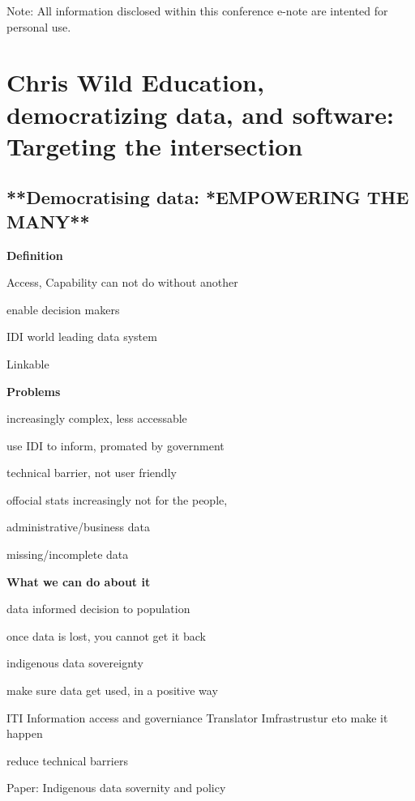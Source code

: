 \documentclass[
]{book}
\begin{document}
Note: All information disclosed within this conference e-note are intented for personal use.

\hypertarget{chris-wild-education-democratizing-data-and-software-targeting-the-intersection}{%
\chapter*{Chris Wild \textbar{} Education, democratizing data, and software: Targeting the intersection}\label{chris-wild-education-democratizing-data-and-software-targeting-the-intersection}}

\hypertarget{democratising-data-empowering-the-many}{%
\section{**Democratising data: *EMPOWERING THE MANY**}\label{democratising-data-empowering-the-many}}

\textbf{Definition}

Access, Capability can not do without another

enable decision makers

IDI world leading data system

Linkable

\textbf{Problems}

increasingly complex, less accessable

use IDI to inform, promated by government

technical barrier, not user friendly

offocial stats increasingly not for the people,

administrative/business data

missing/incomplete data

\textbf{What we can do about it}

data informed decision to population

once data is lost, you cannot get it back

indigenous data sovereignty

make sure data get used, in a positive way

ITI
Information access and governiance
Translator
Imfrastrustur eto make it happen

reduce technical barriers

Paper: Indigenous data sovernity and policy
\end{document}
